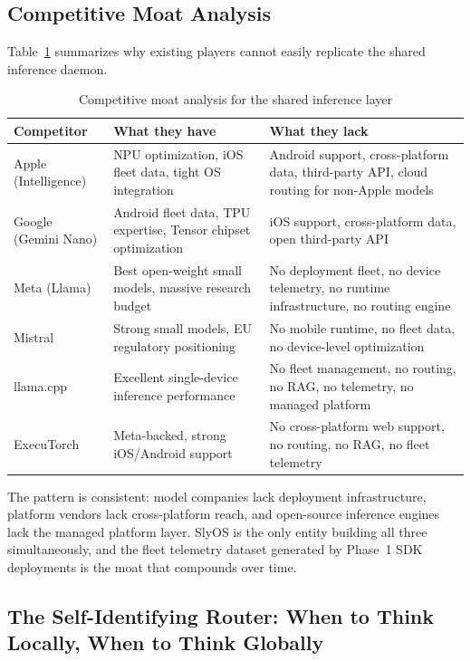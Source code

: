\documentclass[12pt, letterpaper, twoside]{report}
\begin{document}
\subsection{Competitive Moat Analysis}

Table~\ref{tab:moat_analysis} summarizes why existing players cannot easily replicate the shared inference daemon.

\begin{table}[H]
\centering
\caption{Competitive moat analysis for the shared inference layer}
\label{tab:moat_analysis}
{\small
\begin{tabularx}{\textwidth}{@{}lXX@{}}
\toprule
\textbf{Competitor} & \textbf{What they have} & \textbf{What they lack} \\
\midrule
Apple (Intelligence) & NPU optimization, iOS fleet data, tight OS integration & Android support, cross-platform data, third-party API, cloud routing for non-Apple models \\
\addlinespace
Google (Gemini Nano) & Android fleet data, TPU expertise, Tensor chipset optimization & iOS support, cross-platform data, open third-party API \\
\addlinespace
Meta (Llama) & Best open-weight small models, massive research budget & No deployment fleet, no device telemetry, no runtime infrastructure, no routing engine \\
\addlinespace
Mistral & Strong small models, EU regulatory positioning & No mobile runtime, no fleet data, no device-level optimization \\
\addlinespace
llama.cpp & Excellent single-device inference performance & No fleet management, no routing, no RAG, no telemetry, no managed platform \\
\addlinespace
ExecuTorch & Meta-backed, strong iOS/Android support & No cross-platform web support, no routing, no RAG, no fleet telemetry \\
\bottomrule
\end{tabularx}
}
\end{table}

The pattern is consistent: model companies lack deployment infrastructure, platform vendors lack cross-platform reach, and open-source inference engines lack the managed platform layer. SlyOS is the only entity building all three simultaneously, and the fleet telemetry dataset generated by Phase~1 SDK deployments is the moat that compounds over time.

\subsection{The Self-Identifying Router: When to Think Locally, When to Think Globally}
\end{document}
